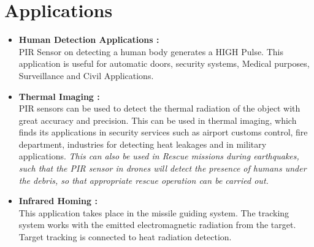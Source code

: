 \documentclass[a4paper,12 pt]{article}
\begin{document}
\section{Applications}
\begin{itemize}
\item \textbf{Human Detection Applications : }\\
PIR Sensor on detecting a human body generates a HIGH Pulse. This application is useful for automatic doors, security systems, Medical purposes, Surveillance and Civil Applications.

\item \textbf{Thermal Imaging :}\\
PIR sensors can be used to detect the thermal radiation of the object with great accuracy and precision. This can be used in thermal imaging, which finds its applications in security services such as airport customs control, fire department, industries for detecting heat leakages and in military applications. \textit{ This can also be used in Rescue missions during earthquakes, such that the PIR sensor in drones will detect the presence of humans under the debris, so that appropriate rescue operation can be carried out.}

\item \textbf{Infrared Homing :}\\
This application takes place in the missile guiding system. The tracking system works with the emitted electromagnetic radiation from the target. Target tracking is connected to heat radiation detection.
\end{itemize}
\end{document}
